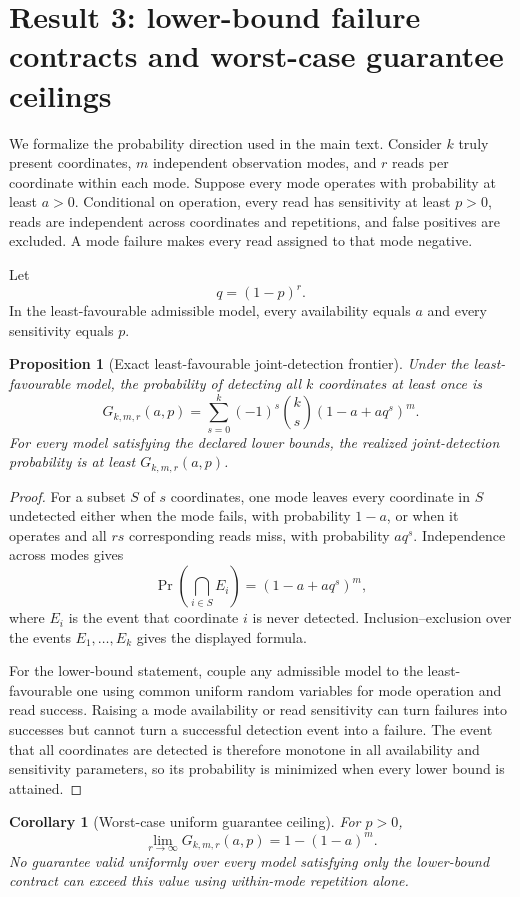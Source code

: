 \documentclass[11pt]{article}
\newtheorem{proposition}{Proposition}
\newtheorem{corollary}{Corollary}
\begin{document}
\section{Result 3: lower-bound failure contracts and worst-case guarantee ceilings}
We formalize the probability direction used in the main text. Consider $k$ truly present coordinates, $m$ independent observation modes, and $r$ reads per coordinate within each mode. Suppose every mode operates with probability at least $a>0$. Conditional on operation, every read has sensitivity at least $p>0$, reads are independent across coordinates and repetitions, and false positives are excluded. A mode failure makes every read assigned to that mode negative.

Let
\[
q=(1-p)^r.
\]
In the least-favourable admissible model, every availability equals $a$ and every sensitivity equals $p$.

\begin{proposition}[Exact least-favourable joint-detection frontier]
Under the least-favourable model, the probability of detecting all $k$ coordinates at least once is
\[
G_{k,m,r}(a,p)=
\sum_{s=0}^{k}(-1)^s {k\choose s}
\left(1-a+a q^s\right)^m.
\]
For every model satisfying the declared lower bounds, the realized joint-detection probability is at least $G_{k,m,r}(a,p)$.
\end{proposition}

\begin{proof}
For a subset $S$ of $s$ coordinates, one mode leaves every coordinate in $S$ undetected either when the mode fails, with probability $1-a$, or when it operates and all $rs$ corresponding reads miss, with probability $a q^s$. Independence across modes gives
\[
\Pr\!\left(\bigcap_{i\in S}E_i\right)=
(1-a+a q^s)^m,
\]
where $E_i$ is the event that coordinate $i$ is never detected. Inclusion--exclusion over the events $E_1,\ldots,E_k$ gives the displayed formula.

For the lower-bound statement, couple any admissible model to the least-favourable one using common uniform random variables for mode operation and read success. Raising a mode availability or read sensitivity can turn failures into successes but cannot turn a successful detection event into a failure. The event that all coordinates are detected is therefore monotone in all availability and sensitivity parameters, so its probability is minimized when every lower bound is attained.
\end{proof}

\begin{corollary}[Worst-case uniform guarantee ceiling]
For $p>0$,
\[
\lim_{r\to\infty}G_{k,m,r}(a,p)=1-(1-a)^m.
\]
No guarantee valid uniformly over every model satisfying only the lower-bound contract can exceed this value using within-mode repetition alone.
\end{corollary}
\end{document}
